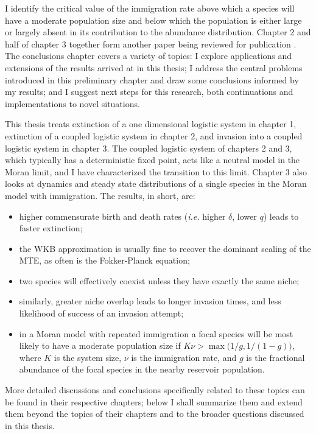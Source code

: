 I identify the critical value of the immigration rate above which a species will have a moderate population size and below which the population is either large or largely absent in its contribution to the abundance distribution. %
Chapter 2 and half of chapter 3 together form another paper being reviewed for publication \cite{Badali2018}. %
The conclusions chapter covers a variety of topics: I explore applications and extensions of the results arrived at in this thesis; I address the central problems introduced in this preliminary chapter and draw some conclusions informed by my results; and I suggest next steps for this research, both continuations and implementations to novel situations. 
\fi


This thesis treats extinction of a one dimensional logistic system in chapter 1, extinction of a coupled logistic system in chapter 2, and invasion into a coupled logistic system in chapter 3. 
The coupled logistic system of chapters 2 and 3, which typically has a deterministic fixed point, acts like a neutral model in the Moran limit, and I have characterized the transition to this limit. 
Chapter 3 also looks at dynamics and steady state distributions of a single species in the Moran model with immigration. %
The results, in short, are: 
\begin{itemize}
	\item higher commensurate birth and death rates (\emph{i.e.} higher $\delta$, lower $q$) leads to faster extinction; 
	\item the WKB approximation is usually fine to recover the dominant scaling of the MTE, as often is the Fokker-Planck equation; 
	\item two species will effectively coexist unless they have exactly the same niche; 
	\item similarly, greater niche overlap leads to longer invasion times, and less likelihood of success of an invasion attempt; 
	\item in a Moran model with repeated immigration a focal species will be most likely to have a moderate population size if $K\nu > \max\big(1/g,1/(1-g)\big)$, where $K$ is the system size, $\nu$ is the immigration rate, and $g$ is the fractional abundance of the focal species in the nearby reservoir population. 
\end{itemize}
More detailed discussions and conclusions specifically related to these topics can be found in their respective chapters; below I shall summarize them and extend them beyond the topics of their chapters and to the broader questions discussed in this thesis. 

